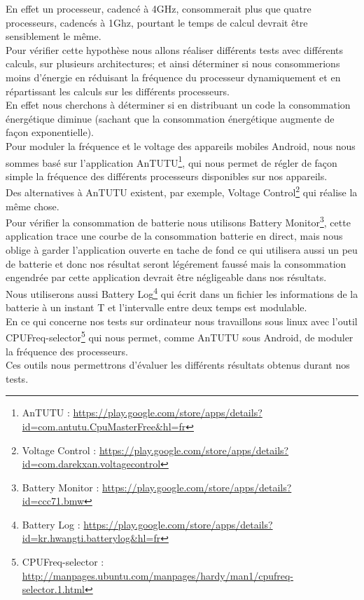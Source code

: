 	En effet un processeur, cadencé à 4GHz, consommerait plus que quatre processeurs, cadencés à 1Ghz, pourtant le temps de calcul devrait être sensiblement le même.\\

	Pour vérifier cette hypothèse nous allons réaliser différents tests avec différents calculs, sur plusieurs architectures; et ainsi déterminer si nous consommerions moins d'énergie en réduisant la fréquence du processeur dynamiquement et en répartissant les calculs sur les différents processeurs.\\

	En effet nous cherchons à déterminer si en distribuant un code la consommation énergétique diminue (sachant que la consommation énergétique augmente de façon exponentielle).\\

	Pour moduler la fréquence et le voltage des appareils mobiles Android, nous nous sommes basé sur l'application AnTUTU\footnote{AnTUTU : \url{https://play.google.com/store/apps/details?id=com.antutu.CpuMasterFree&hl=fr}}, qui nous permet de régler de façon simple la fréquence des différents processeurs disponibles sur nos appareils.\\

	Des alternatives à AnTUTU existent, par exemple, Voltage Control\footnote{Voltage Control : \url{https://play.google.com/store/apps/details?id=com.darekxan.voltagecontrol}} qui réalise la même chose. \\

	Pour vérifier la consommation de batterie nous utilisons Battery Monitor\footnote{Battery Monitor : \url{https://play.google.com/store/apps/details?id=ccc71.bmw}}, cette application trace une courbe de la consommation batterie en direct, mais nous oblige à garder l'application ouverte en tache de fond ce qui utilisera aussi un peu de batterie et donc nos résultat seront légérement faussé mais la consommation engendrée par cette application devrait être négligeable dans nos résultats. \\

	Nous utiliserons aussi Battery Log\footnote{Battery Log : \url{https://play.google.com/store/apps/details?id=kr.hwangti.batterylog&hl=fr}} qui écrit dans un fichier les informations de la batterie à un instant T et l'intervalle entre deux temps est modulable.\\

	En ce qui concerne nos tests sur ordinateur nous travaillons sous linux avec l'outil CPUFreq-selector\footnote{CPUFreq-selector : \url{http://manpages.ubuntu.com/manpages/hardy/man1/cpufreq-selector.1.html}} qui nous permet, comme AnTUTU sous Android, de moduler la fréquence des processeurs.\\

	Ces outils nous permettrons d'évaluer les différents résultats obtenus durant nos tests.
